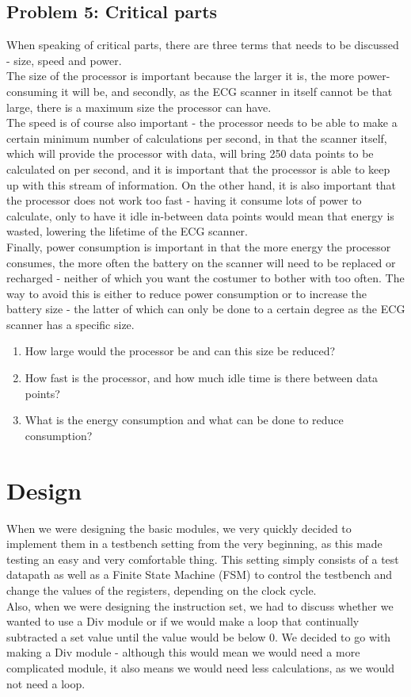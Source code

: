 \documentclass[12pt,a4paper]{article}
\begin{document}
\subsection{Problem 5: Critical parts}
When speaking of critical parts, there are three terms that needs to be discussed - size, speed and power. \\
The size of the processor is important because the larger it is, the more power-consuming it will be, and secondly, as the ECG scanner in itself cannot be that large, there is a maximum size the processor can have.\\
The speed is of course also important - the processor needs to be able to make a certain minimum number of calculations per second, in that the scanner itself, which will provide the processor with data, will bring 250 data points to be calculated on per second, and it is important that the processor is able to keep up with this stream of information. On the other hand, it is also important that the processor does not work too fast - having it consume lots of power to calculate, only to have it idle in-between data points would mean that energy is wasted, lowering the lifetime of the ECG scanner.\\
Finally, power consumption is important in that the more energy the processor consumes, the more often the battery on the scanner will need to be replaced or recharged - neither of which you want the costumer to bother with too often. The way to avoid this is either to reduce power consumption or to increase the battery size - the latter of which can only be done to a certain degree as the ECG scanner has a specific size.\\
\begin{enumerate}
\item How large would the processor be and can this size be reduced?
\item How fast is the processor, and how much idle time is there between data points?
\item What is the energy consumption and what can be done to reduce consumption?
\end{enumerate}

\section{Design}
When we were designing the basic modules, we very quickly decided to implement them in a testbench setting from the very beginning, as this made testing an easy and very comfortable thing. This setting simply consists of a test datapath as well as a Finite State Machine (FSM) to control the testbench and change the values of the registers, depending on the clock cycle.\\
Also, when we were designing the instruction set, we had to discuss whether we wanted to use a Div module or if we would make a loop that continually subtracted a set value until the value would be below 0. We decided to go with making a Div module - although this would mean we would need a more complicated module, it also means we would need less calculations, as we would not need a loop.
\end{document}
